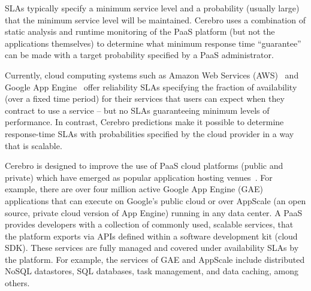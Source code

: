 SLAs typically specify a minimum service level and a
probability (usually large) that the minimum service level will be
maintained.  Cerebro uses a combination of static analysis and runtime
monitoring of the PaaS platform (but not the applications themselves) 
to determine what
minimum response time ``guarantee'' can be made with a target probability
specified by a PaaS administrator.  

Currently, cloud computing systems such as Amazon Web Services
(AWS)~\cite{amazon-aws-web} and
Google App Engine~\cite{gae} offer reliability SLAs specifying the fraction of
availability (over a fixed time period) for their services
that users can expect when they contract to use a service -- but no SLAs
guaranteeing minimum levels of performance.
In contrast, Cerebro predictions make it possible to determine response-time SLAs with
probabilities specified by the cloud provider in a way
that is scalable.


Cerebro is designed to improve the use of PaaS cloud 
platforms (public and private) which have emerged as popular application
hosting venues~\cite{paas-growth}.
For example, there are over four million active Google App Engine (GAE) 
applications that 
can execute on Google's public cloud or over AppScale (an open source, private 
cloud version of App Engine) running in any data center.
A PaaS provides developers 
with a collection of commonly used, scalable services,
that the platform exports via APIs defined within a software 
development kit (cloud SDK).  These services are fully managed and covered under 
availability SLAs by the platform. For example, the services 
of GAE and AppScale 
include distributed NoSQL datastores, SQL databases, task management, 
and data caching, among others. 

